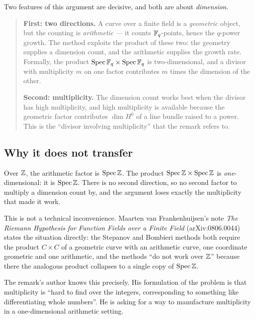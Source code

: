 Two features of this argument are decisive, and both are about \emph{dimension}.

\begin{quote}
\textbf{First: two directions.} A curve over a finite field is a
\emph{geometric} object, but the counting is \emph{arithmetic} --- it counts
$\mathbb{F}_q$-points, hence the $q$-power growth. The method exploits the product of
these two: the geometry supplies a dimension count, and the arithmetic
supplies the growth rate. Formally, the product $\operatorname{Spec}\mathbb{F}_q
\times \operatorname{Spec}\mathbb{F}_q$ is two-dimensional, and a divisor with
multiplicity $m$ on one factor contributes $m$ times the dimension of the
other.

\textbf{Second: multiplicity.} The dimension count works best when the
divisor has high multiplicity, and high multiplicity is available because the
geometric factor contributes $\dim H^0$ of a line bundle raised to a power.
This is the ``divisor involving multiplicity'' that the remark refers to.
\end{quote}

\subsection{Why it does not transfer}Over $\mathbb{Z}$, the arithmetic factor is $\operatorname{Spec}\mathbb{Z}$. The product
$\operatorname{Spec}\mathbb{Z} \times \operatorname{Spec}\mathbb{Z}$ is \emph{one}-dimensional:
it is $\operatorname{Spec}\mathbb{Z}$. There is no second direction, so no second
factor to multiply a dimension count by, and the argument loses exactly the
multiplicity that made it work.

This is not a technical inconvenience. Maarten van Frankenhuijsen's note
\emph{The Riemann Hypothesis for Function Fields over a Finite Field}
(arXiv:0806.0044) states the situation directly: the Stepanov and Bombieri
methods both require the product $C \times C$ of a geometric curve with an
arithmetic curve, one coordinate geometric and one arithmetic, and the methods
``do not work over $\mathbb{Z}$'' because there the analogous product collapses to a
single copy of $\operatorname{Spec}\mathbb{Z}$.

The remark's author knows this precisely. His formulation of the problem is
that multiplicity is ``hard to find over the integers, corresponding to
something like differentiating whole numbers''. He is asking for a way to
manufacture multiplicity in a one-dimensional arithmetic setting.

